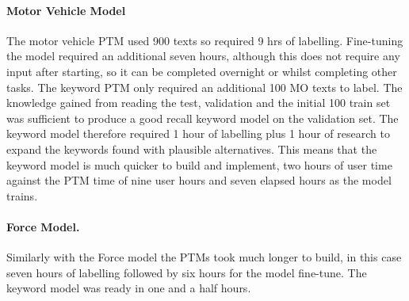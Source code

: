 \paragraph{Motor Vehicle Model} The motor vehicle PTM used 900 texts so required 9 hrs of labelling. Fine-tuning the model required an additional seven hours, although this does not require any input after starting, so it can be completed overnight or whilst completing other tasks. The keyword PTM only required an additional 100 MO texts to label. The knowledge gained from reading the test, validation and the initial 100 train set was sufficient to produce a good recall keyword model on the validation set. The keyword model therefore required 1 hour of labelling plus 1 hour of research to expand the keywords found with plausible alternatives. This means that the keyword model is much quicker to build and implement, two hours of user time against the PTM time of nine user hours and seven elapsed hours as the model trains.  

\paragraph{Force Model.} Similarly with the Force model the PTMs took much longer to build, in this case seven hours of labelling followed by six hours for the model fine-tune. The keyword model was ready in one and a half hours.

